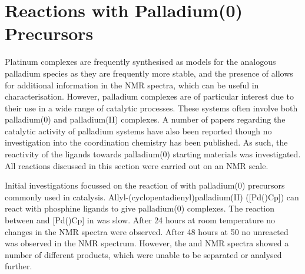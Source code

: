 %
%
%
%
%
%




\section{Reactions with Palladium(0) Precursors}

Platinum complexes are frequently synthesised as models for the analogous palladium species as they are frequently more stable, and the presence of \Pt{} allows for additional information in the NMR spectra, which can be useful in characterisation.  However, palladium complexes are of particular interest due to their use in a wide range of catalytic processes.  These systems often involve both palladium(0) and palladium(II) complexes.  A number of papers regarding the catalytic activity of palladium \tBuxantphos{} systems have also been reported though no investigation into the coordination chemistry has been published.  As such, the reactivity of the \tBuxantphos{} ligands towards palladium(0) starting materials was investigated.  All reactions discussed in this section were carried out on an NMR scale.  

Initial investigations focussed on the reaction of \tButhixantphos{} with palladium(0) precursors commonly used in catalysis.  Allyl-(cyclopentadienyl)palladium(II) ([Pd()Cp]) can react with phosphine ligands to give palladium(0) complexes. The reaction between \tButhixantphos{} and [Pd()Cp] in  was slow.  After 24 hours at room temperature no changes in the NMR spectra were observed.  After 48 hours at 50 \degC{} no unreacted \tButhixantphos{} was observed in the \phosphorus{} NMR spectrum.  However, the \phosphorus{} and \proton{} NMR spectra showed a number of different products, which were unable to be separated or analysed further.


